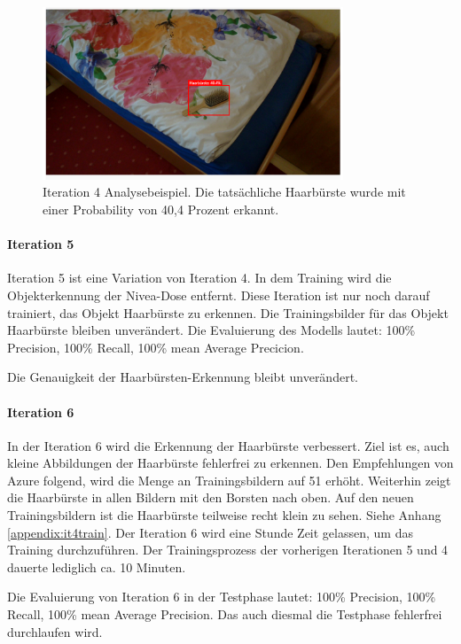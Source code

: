 \begin{figure}[H]
	\centering
	\includegraphics[width=0.8\textwidth]{images/it4notpretty2.png}
	\caption[Iteration 4 zweites Analysebeispiel]{Iteration 4 Analysebeispiel. Die tatsächliche Haarbürste wurde mit einer Probability von 40,4 Prozent erkannt.}
	\label{img:it4}
\end{figure}
\paragraph{Iteration 5}

Iteration 5 ist eine Variation von Iteration 4. In dem Training wird die Objekterkennung der Nivea-Dose entfernt. Diese Iteration ist nur noch darauf trainiert, das Objekt Haarbürste zu erkennen. Die Trainingsbilder für das Objekt Haarbürste bleiben unverändert. Die Evaluierung des Modells lautet: 100\% Precision, 100\% Recall, 100\% mean Average Precicion.

Die Genauigkeit der Haarbürsten-Erkennung bleibt unverändert.

\paragraph{Iteration 6}

In der Iteration 6 wird die Erkennung der Haarbürste verbessert. Ziel ist es, auch kleine Abbildungen der Haarbürste fehlerfrei zu erkennen. Den Empfehlungen von Azure folgend, wird die Menge an Trainingsbildern auf 51 erhöht. Weiterhin zeigt die Haarbürste in allen Bildern mit den Borsten nach oben. Auf den neuen Trainingsbildern ist die Haarbürste teilweise recht klein zu sehen. Siehe Anhang \ref{appendix:it4train}. Der Iteration 6 wird eine Stunde Zeit gelassen, um das Training durchzuführen. Der Trainingsprozess der vorherigen Iterationen 5 und 4 dauerte lediglich ca. 10 Minuten.

Die Evaluierung von Iteration 6 in der Testphase lautet: 100\% Precision, 100\% Recall, 100\% mean Average Precision. Das auch diesmal die Testphase fehlerfrei durchlaufen wird. 

